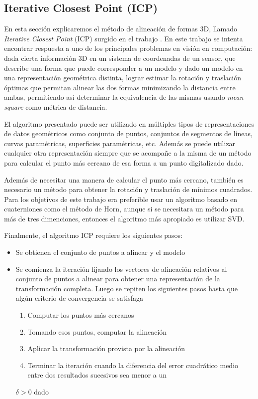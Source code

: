 \subsection{Iterative Closest Point (ICP)}\label{ICP}
En esta sección explicaremos el método de alineación de formas 3D, llamado \textit{Iterative Closest Point} (ICP) surgido en el trabajo \cite{besl1992method}. En este trabajo se intenta encontrar respuesta a uno de los principales problemas en visión en computación: dada cierta información 3D en un sistema de coordenadas de un sensor, que describe una forma que puede corresponder a un modelo y dado un modelo en una representación geométrica distinta, lograr estimar la rotación y traslación óptimas que permitan alinear las dos formas minimizando la distancia entre ambas, permitiendo así determinar la equivalencia de las mismas usando \textit{mean-square} como métrica de distancia.

El algoritmo presentado puede ser utilizado en múltiples tipos de representaciones de datos geométricos como conjunto de puntos, conjuntos de segmentos de líneas, curvas paramétricas, superficies paramétricas, etc. Además se puede utilizar cualquier otra representación siempre que se acompañe a la misma de un método para calcular el punto más cercano de esa forma a un punto digitalizado dado.

Además de necesitar una manera de calcular el punto más cercano, también es necesario un método para obtener la rotación y traslación de mínimos cuadrados. Para los objetivos de este trabajo era preferible usar un algoritmo basado en cuaterniones como el método de Horn, aunque si se necesitara un método para más de tres dimenciones, entonces el algoritmo más apropiado es utilizar SVD.

Finalmente, el algoritmo ICP requiere los siguientes pasos:
\begin{itemize}
	\item Se obtienen el conjunto de puntos a alinear y el modelo
	\item Se comienza la iteración fijando los vectores de alineación relativos al conjunto de puntos a alinear para obtener una representación de la transformación completa. Luego se repiten los siguientes pasos hasta que algún criterio de convergencia se satisfaga
	\begin{enumerate}
		\item Computar los puntos más cercanos
		\item Tomando esos puntos, computar la alineación
		\item Aplicar la transformación provista por la alineación
		\item Terminar la iteración cuando la diferencia del error cuadrático medio entre dos resultados sucesivos sea menor a un
	\end{enumerate}
 $\delta > 0$ dado
\end{itemize}

